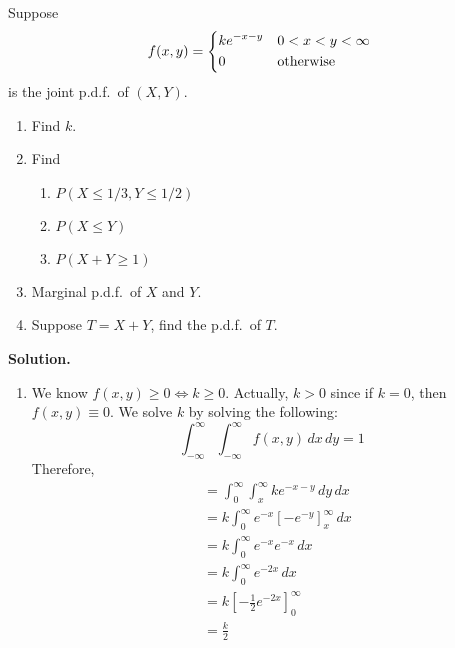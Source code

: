 \begin{Example}{}{}
    Suppose
    \[ f(x,y)=\begin{dcases}
            ke^{-x-y} & 0<x<y<\infty     \\
            0         & \text{otherwise}
        \end{dcases} \]
    is the joint p.d.f.\ of $ (X,Y) $.
    \begin{enumerate}[label=(\roman*)]
        \item Find $ k $.
        \item Find
              \begin{enumerate}[label=(\alph*)]
                  \item $ P(X\leqslant 1/3,Y\leqslant 1/2) $
                  \item $ P(X\leqslant Y) $
                  \item $ P(X+Y\geqslant 1) $
              \end{enumerate}
        \item Marginal p.d.f.\ of $ X $ and $ Y $.
        \item Suppose $ T=X+Y $, find the p.d.f.\ of $ T $.
    \end{enumerate}
    \textbf{Solution.}
    \begin{enumerate}[label=(\roman*)]
        \item We know $ f(x,y)\geqslant 0\iff k\geqslant 0 $. Actually,
              $ k>0 $ since if $ k=0 $, then $ f(x,y)\equiv 0 $.
              We solve $ k $ by solving the following:
              \[ \int_{-\infty}^{\infty} \int_{-\infty}^{\infty} f(x,y)\, d{x} \, d{y} =1 \]
              Therefore,
              \begin{align*}
                   & =\int_{0}^{\infty} \int_{x}^{\infty} ke^{-x-y}\, d{y} \, d{x}     \\
                   & =k \int_{0}^{\infty} e^{-x}\left[ -e^{-y} \right]_x^\infty\, d{x} \\
                   & =k \int_{0}^{\infty} e^{-x}e^{-x}\, d{x}                          \\
                   & =k \int_{0}^{\infty} e^{-2x}\, d{x}                               \\
                   & =k\left[ -\frac{1}{2} e^{-2x} \right]_0^\infty                    \\
                   & =\frac{k}{2}
              \end{align*}


\end{enumerate}
\end{Example}
